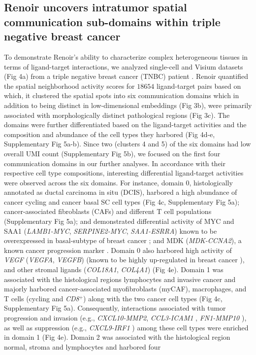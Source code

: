 
\subsection*{Renoir uncovers intratumor spatial communication sub-domains within triple negative breast cancer}

To demonstrate Renoir's ability to characterize complex heterogeneous tissues in terms of ligand-target interactions, we analyzed single-cell and Visium datasets (Fig 4a) from a triple negative breast cancer (TNBC) patient \citep{Wu2021}. Renoir quantified the spatial neighborhood activity scores for $18654$ ligand-target pairs based on which, it clustered the spatial spots into six communication domains which in addition to being distinct in low-dimensional embeddings (Fig 3b), were primarily associated with morphologically distinct pathological regions (Fig 3c). The domains were further differentiated based on the ligand-target activities and the composition and abundance of the cell types they harbored (Fig 4d-e, Supplementary Fig 5a-b). Since two (clusters 4 and 5) of the six domains had low overall UMI count (Supplementary Fig 5b), we focused on the first four communication domains in our further analyses. In accordance with their respective cell type compositions, interesting differential ligand-target activities were observed across the six domains. For instance, domain 0, histologically annotated as ductal carcinoma in situ (DCIS), harbored a high abundance of cancer cycling and cancer basal SC cell types (Fig 4c, Supplementary Fig 5a); cancer-associated fibroblasts (CAFs) and different T cell populations (Supplementary Fig 5a); and demonstrated differential activity of MYC and SAA1 (\textit{LAMB1-MYC}, \textit{SERPINE2-MYC}, \textit{SAA1-ESRRA}) known to be overexpressed in basal-subtype of breast cancer \citep{doi:10.1073/pnas.191367098,doi:10.1073/pnas.1732912100,OT26566}; and MDK (\textit{MDK-CCNA2}), a known cancer progression marker \citep{Filippou2020}. Domain 0 also harbored high activity of \textit{VEGF} (\textit{VEGFA}, \textit{VEGFB}) (known to be highly up-regulated in breast cancer \citep{RIBATTI2016453,Harmey1998,Lewis2000}), and other stromal ligands (\textit{COL18A1}, \textit{COL4A1}) (Fig 4e). Domain 1 was associated with the histological regions lymphocytes and invasive cancer and majorly harbored cancer-associated myofibroblasts (myCAF), macrophages, and T cells (cycling and \textit{CD8}$^{+}$) along with the two cancer cell types (Fig 4c, Supplementary Fig 5a). Consequently, interactions associated with tumor progression and invasion (e.g., \textit{CXCL10-MMP2}, \textit{CCL3-ICAM1} \citep{doi:10.1073/pnas.1408556111}, \textit{FN1-MMP10} \citep{MCGOWAN20081566}), as well as suppression (e.g., \textit{CXCL9-IRF1} \citep{10.1158/1078-0432.CCR-19-1868}) among these cell types were enriched in domain 1 (Fig 4e). Domain 2 was associated with the histological region normal, stroma and lymphocytes and harbored four 